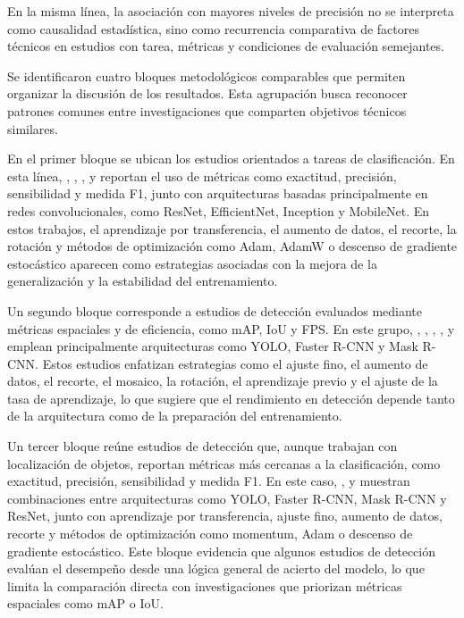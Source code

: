 En la misma línea, la asociación con mayores niveles de precisión no se interpreta como causalidad estadística, sino como recurrencia comparativa de factores técnicos en estudios con tarea, métricas y condiciones de evaluación semejantes. 

Se identificaron cuatro bloques metodológicos comparables que permiten organizar la discusión de los resultados. Esta agrupación busca reconocer patrones comunes entre investigaciones que comparten objetivos técnicos similares.

En el primer bloque se ubican los estudios orientados a tareas de clasificación. En esta línea, \textcite{alves2020detection}, \textcite{spiesman2021bumblebee}, \textcite{spiesman2024identifying}, \textcite{calisan2025evaluation} y \textcite{stark2025pollinators} reportan el uso de métricas como exactitud, precisión, sensibilidad y medida F1, junto con arquitecturas basadas principalmente en redes convolucionales, como ResNet, EfficientNet, Inception y MobileNet. En estos trabajos, el aprendizaje por transferencia, el aumento de datos, el recorte, la rotación y métodos de optimización como Adam, AdamW o descenso de gradiente estocástico aparecen como estrategias asociadas con la mejora de la generalización y la estabilidad del entrenamiento.

Un segundo bloque corresponde a estudios de detección evaluados mediante métricas espaciales y de eficiencia, como mAP, IoU y FPS. En este grupo, \textcite{stark2023yolo}, \textcite{alex2025pollinator}, \textcite{lei2024out}, \textcite{sledevic2024keypoint}, \textcite{stefan2025successes} y \textcite{sledevic2025visual} emplean principalmente arquitecturas como YOLO, Faster R-CNN y Mask R-CNN. Estos estudios enfatizan estrategias como el ajuste fino, el aumento de datos, el recorte, el mosaico, la rotación, el aprendizaje previo y el ajuste de la tasa de aprendizaje, lo que sugiere que el rendimiento en detección depende tanto de la arquitectura como de la preparación del entrenamiento.

Un tercer bloque reúne estudios de detección que, aunque trabajan con localización de objetos, reportan métricas más cercanas a la clasificación, como exactitud, precisión, sensibilidad y medida F1. En este caso, \textcite{kongsilp2024individual}, \textcite{nguyen2024improving} y \textcite{bjerge2023accurate} muestran combinaciones entre arquitecturas como YOLO, Faster R-CNN, Mask R-CNN y ResNet, junto con aprendizaje por transferencia, ajuste fino, aumento de datos, recorte y métodos de optimización como momentum, Adam o descenso de gradiente estocástico. Este bloque evidencia que algunos estudios de detección evalúan el desempeño desde una lógica general de acierto del modelo, lo que limita la comparación directa con investigaciones que priorizan métricas espaciales como mAP o IoU.

